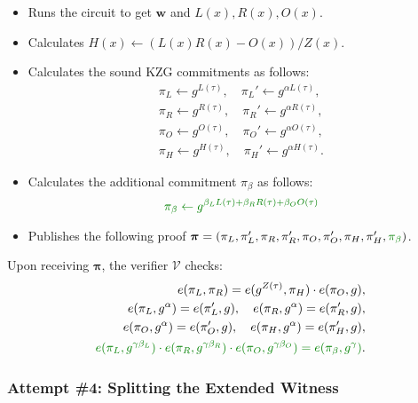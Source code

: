 \documentclass[../lecture-notes.tex]{subfiles}
\begin{document}
\begin{tcolorbox}
\begin{itemize}[label=, left=0mm]
        \item Runs the circuit to get $\mathbf{w}$ and $L(x),R(x),O(x)$.
        \item Calculates $H(x) \gets (L(x)R(x) - O(x))\big/ Z(x)$.
        \item Calculates the sound KZG commitments as follows: 
        \begin{align*}
            \pi_L \gets g^{L(\tau)}, \quad \pi_L' \gets g^{\alpha L(\tau)}, \\
            \pi_R \gets g^{R(\tau)}, \quad \pi_R' \gets g^{\alpha R(\tau)}, \\
            \pi_O \gets g^{O(\tau)}, \quad \pi_O' \gets g^{\alpha O(\tau)}, \\
            \pi_H \gets g^{H(\tau)}, \quad \pi_H' \gets g^{\alpha H(\tau)}.
        \end{align*}
        \item \textcolor{green!50!black}{Calculates the additional commitment $\pi_{\beta}$ as follows:}
        \begin{equation*}
            \textcolor{green!50!black}{\pi_{\beta} \gets g^{\beta_LL(\tau) + \beta_RR(\tau) + \beta_OO(\tau)}}
        \end{equation*}
        \item Publishes the following proof $\boldsymbol{\pi} = (\pi_L,\pi_L',\pi_R,\pi_R',\pi_O,\pi_O',\pi_H,\pi_H',\textcolor{green!50!black}{\pi_{\beta}})$.
    \end{itemize}

    Upon receiving $\boldsymbol{\pi}$, the verifier $\mathcal{V}$ checks:
    \begin{align*}
        e(\pi_L, \pi_R) = e(g^{Z(\tau)}, \pi_H) \cdot e(\pi_O, g), \\
        e(\pi_L, g^{\alpha}) = e(\pi_L', g), \quad e(\pi_R, g^{\alpha}) = e(\pi_R', g), \\
        e(\pi_O, g^{\alpha}) = e(\pi_O', g), \quad e(\pi_H, g^{\alpha}) = e(\pi_H', g), \\
        \textcolor{green!50!black}{e(\pi_L, g^{\gamma\beta_L}) \cdot e(\pi_R, g^{\gamma\beta_R}) \cdot e(\pi_O, g^{\gamma\beta_O}) = e(\pi_{\beta}, g^{\gamma})}.
    \end{align*}
\end{tcolorbox}

\subsubsection*{Attempt \#4: Splitting the Extended Witness}
\end{document}
